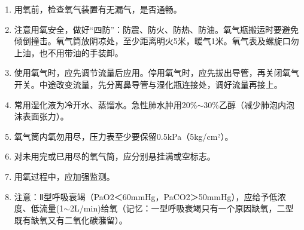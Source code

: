 \documentclass[11pt, a4paper]{ctexart}
\begin{document}
\begin{enumerate}
\begin{itemize}
\begin{enumerate}
			            \item 用氧前，检查氧气装置有无漏气，是否通畅。
			            \item 注意用氧安全，做好“四防”：防震、防火、防热、防油。氧气瓶搬运时要避免倾倒撞击。氧气筒放阴凉处，至少距离明火5米，暖气1米。氧气表及螺旋口勿上油，也不用带油的手装卸。
			            \item 使用氧气时，应先调节流量后应用。停用氧气时，应先拔出导管，再关闭氧气开关。中途改变流量，先分离鼻导管与湿化瓶连接处，调好流量再接上。
			            \item 常用湿化液为冷开水、蒸馏水。急性肺水肿用20\%$\sim$30\%乙醇（减少肺泡内泡沫表面张力）。
			            \item 氧气筒内氧勿用尽，压力表至少要保留0.5kPa（5kg/cm²）。
			            \item 对未用完或已用尽的氧气筒，应分别悬挂满或空标志。
			            \item 用氧过程中，应加强监测。
			            \item 注意：Ⅱ型呼吸衰竭（PaO2＜60mmHg，PaCO2＞50mmHg），应给予低浓度、低流量(1$\sim$2L/min)给氧（记忆：一型呼吸衰竭只有一个原因缺氧，二型既有缺氧又有二氧化碳潴留）。
		            \end{enumerate}
	      \end{itemize}
\end{enumerate}
\end{document}
